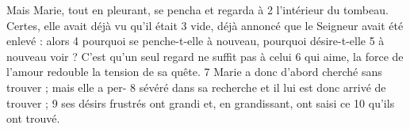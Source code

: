 Mais Marie, tout en pleurant, se pencha et regarda à	 
2	 	l'intérieur du tombeau. Certes, elle avait déjà vu qu'il était	 
3	 	vide, déjà annoncé que le Seigneur avait été enlevé : alors	 
4	 	pourquoi se penche-t-elle à nouveau, pourquoi désire-t-elle	 
5	 	à nouveau voir ? C'est qu'un seul regard ne suffit pas à celui	 
6	 	qui aime, la force de l'amour redouble la tension de sa quête.	 
7	 	Marie a donc d'abord cherché sans trouver ; mais elle a per-	 
8	 	sévéré dans sa recherche et il lui est donc arrivé de trouver ;	 
9	 	ses désirs frustrés ont grandi et, en grandissant, ont saisi ce	 
10	 	qu'ils ont trouvé.